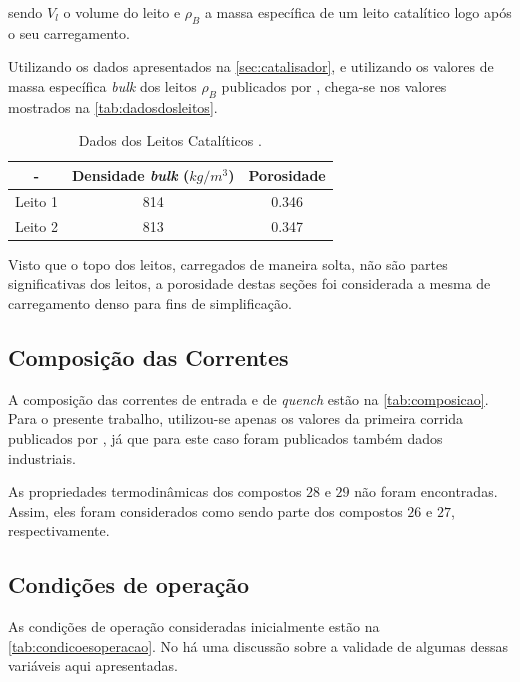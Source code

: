 sendo $V_l$ o volume do leito e $\rho_B$ a massa específica de um leito
catalítico logo após o seu carregamento.

Utilizando os dados apresentados na \autoref{sec:catalisador}, e utilizando os
valores de massa específica \emph{bulk} dos leitos $\rho_{B}$ publicados por
, chega-se nos valores mostrados na
\autoref{tab:dadosdosleitos}.

\begin{table}[!htb]
\begin{center}
\caption{Dados dos Leitos Catalíticos \cite{Rojas2014a}.}
\label{tab:dadosdosleitos}
\small
\begin{tabular}{ccc}
{ - } & {Densidade \emph{bulk} ($kg/m^3$)} & {Porosidade} 
\\
\hline
{Leito 1} & 814 & 0.346 \\
{Leito 2} & 813 & 0.347 \\
\bottomrule
\end{tabular}
\end{center}
\end{table}

Visto que o topo dos leitos, carregados de maneira solta, não são partes
significativas dos leitos, a porosidade destas seções foi
considerada a mesma de carregamento denso para fins de simplificação. 

\subsection{Composição das Correntes} \label{sec:composicaocorrentes}

A composição das correntes de entrada e de \emph{quench} estão na
\autoref{tab:composicao}. Para o presente trabalho, utilizou-se
apenas os valores da primeira corrida publicados por , já
que para este caso foram publicados também dados industriais.

As propriedades termodinâmicas dos compostos $28$ e $29$ não foram
encontradas. Assim, eles foram considerados como sendo parte dos compostos
$26$ e $27$, respectivamente.

\subsection{Condições de operação} \label{sec:condicoesdeoperacao}

As condições de operação consideradas inicialmente estão na
\autoref{tab:condicoesoperacao}. No \label{chap:resultados} há uma discussão
sobre a validade de algumas dessas variáveis aqui apresentadas.

